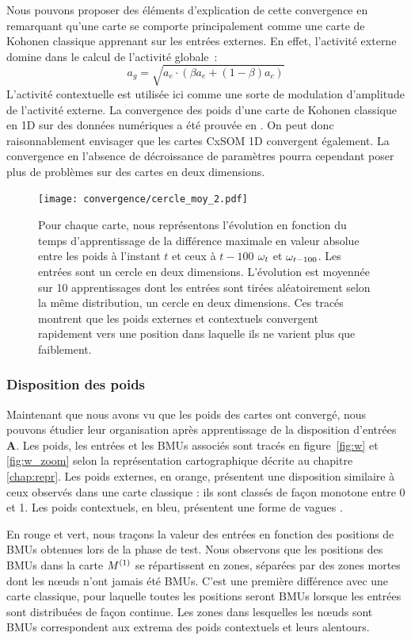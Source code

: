 \documentclass[../main]{subfiles}
\begin{document}
Nous pouvons proposer des éléments d'explication de cette convergence en remarquant qu'une carte se comporte principalement comme une carte de Kohonen classique apprenant sur les entrées externes. En effet, l'activité externe domine dans le calcul de l'activité globale~:
$$ a_g = \sqrt{a_e \cdot (\beta a_e + (1-\beta)a_c)}$$
L'activité contextuelle est utilisée ici comme une sorte de modulation d'amplitude de l'activité externe.
La convergence des poids d'une carte de Kohonen classique en 1D sur des données numériques a été prouvée en \cite{cottrell_theoretical_2016}. 
On peut donc raisonnablement envisager que les cartes CxSOM 1D convergent également.
La convergence en l'absence de décroissance de paramètres pourra cependant poser plus de problèmes sur des cartes en deux dimensions.

\begin{figure}[h!]
	\texttt{[image: convergence/cercle\_moy\_2.pdf]}
	\vspace{-0.5cm}
	\caption{Pour chaque carte, nous représentons l'évolution en fonction du temps d'apprentissage de la différence maximale en valeur absolue entre les poids à l'instant $t$ et ceux à $t-100$ $\omega_t$ et $\omega_{t-100}$. Les entrées sont un cercle en deux dimensions. 
	L'évolution est moyennée sur 10 apprentissages dont les entrées sont tirées aléatoirement selon la même distribution, un cercle en deux dimensions.
	Ces tracés montrent que les poids externes et contextuels convergent rapidement vers une position dans laquelle ils ne varient plus que faiblement.\label{fig:conv}}
\end{figure}


\subsubsection{Disposition des poids}

Maintenant que nous avons vu que les poids des cartes ont convergé, nous pouvons étudier leur organisation après apprentissage de la disposition d'entrées \textbf{A}.
Les poids, les entrées et les BMUs associés sont tracés en figure~\ref{fig:w} et \ref{fig:w_zoom} selon la représentation cartographique décrite au chapitre \ref{chap:repr}.
Les poids externes, en orange, présentent une disposition similaire à ceux observés dans une carte classique : ils sont classés de façon monotone entre 0 et 1.
Les poids contextuels, en bleu, présentent une forme de \og vagues \fg{}. 

En rouge et vert, nous traçons la valeur des entrées en fonction des positions de BMUs obtenues lors de la phase de test.
Nous observons que les positions des BMUs dans la carte $M^{({1})}$ se répartissent en zones, séparées par des zones mortes dont les n\oe{}uds n'ont jamais été BMUs. C'est une première différence avec une carte classique, pour laquelle toutes les positions seront BMUs lorsque les entrées sont distribuées de façon continue.
Les zones dans lesquelles les n\oe{}uds sont BMUs correspondent aux extrema des poids contextuels et leurs alentours.
\end{document}
